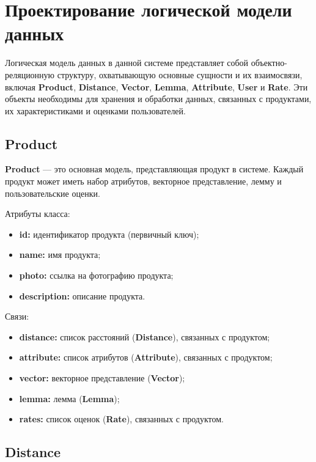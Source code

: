 \section{Проектирование логической модели данных}

Логическая модель данных в данной системе представляет собой объектно-реляционную структуру, охватывающую основные сущности и их взаимосвязи, включая \textbf{Product}, \textbf{Distance}, \textbf{Vector}, \textbf{Lemma}, \textbf{Attribute}, \textbf{User} и \textbf{Rate}. Эти объекты необходимы для хранения и обработки данных, связанных с продуктами, их характеристиками и оценками пользователей.

\subsection{Product}

\textbf{Product} — это основная модель, представляющая продукт в системе. Каждый продукт может иметь набор атрибутов, векторное представление, лемму и пользовательские оценки.

Атрибуты класса:
\begin{itemize}
	\item \textbf{id:} идентификатор продукта (первичный ключ);
	\item \textbf{name:} имя продукта;
	\item \textbf{photo:} ссылка на фотографию продукта;
	\item \textbf{description:} описание продукта.
\end{itemize}

Связи:
\begin{itemize}
	\item \textbf{distance:} список расстояний (\textbf{Distance}), связанных с продуктом;
	\item \textbf{attribute:} список атрибутов (\textbf{Attribute}), связанных с продуктом;
	\item \textbf{vector:} векторное представление (\textbf{Vector});
	\item \textbf{lemma:} лемма (\textbf{Lemma});
	\item \textbf{rates:} список оценок (\textbf{Rate}), связанных с продуктом.
\end{itemize}

\subsection{Distance}

